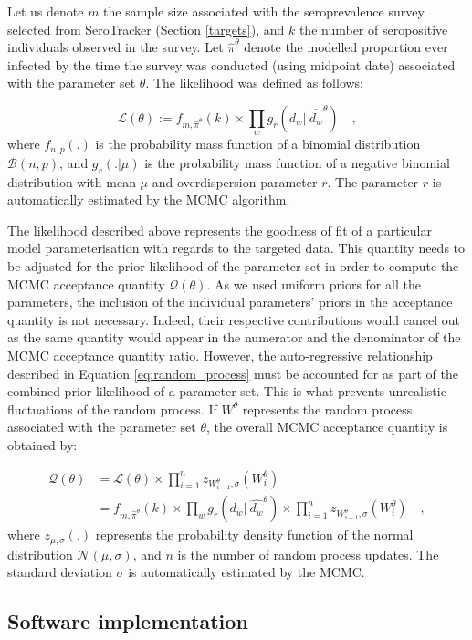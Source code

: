 Let us denote $m$ the sample size associated with the seroprevalence survey selected from SeroTracker (Section \ref{targets}), 
and $k$ the number of seropositive individuals observed in the survey.
Let $\hat{\pi}^\theta$ denote the modelled proportion ever infected by the time the survey was conducted (using midpoint date) 
associated with the parameter set $\theta$. 
The likelihood was defined as follows:

\begin{equation}
    \label{eq:likelihood}
    \mathcal{L}(\theta) := f_{m,\hat{\pi}^\theta}(k) \times \prod_w g_r(d_w | \:\hat{d_w}^\theta) \quad ,
\end{equation}
where $f_{n,p}(.)$ is the probability mass function of a binomial distribution $\mathcal{B}(n,p)$, and 
$g_r(. | \mu)$ is the probability mass function of a negative binomial distribution with mean $\mu$ and 
overdispersion parameter $r$. The parameter $r$ is automatically estimated by the MCMC algorithm.

The likelihood described above represents the goodness of fit of a particular model parameterisation with regards to the targeted data. 
This quantity needs to be adjusted for the prior likelihood of the parameter set in order to compute the MCMC acceptance quantity $\mathcal{Q}(\theta)$.
As we used uniform priors for all the parameters, the inclusion of the individual parameters' priors in the acceptance quantity is not necessary. 
Indeed, their respective contributions would cancel out as the same quantity would appear in the numerator and the denominator of the 
MCMC acceptance quantity ratio. However, the auto-regressive relationship described in Equation \ref{eq:random_process}
must be accounted for as part of the combined prior likelihood of a parameter set. This is what prevents unrealistic fluctuations of the random process.
If $W^\theta$ represents the random process associated with the parameter set $\theta$, the overall MCMC acceptance quantity is obtained by:

\begin{equation}
    \label{eq:acc_qtt}
    \begin{split}
    \mathcal{Q}(\theta) & = \mathcal{L}(\theta) \times \prod_{i=1}^{n} z_{W^\theta_{i-1},\sigma}(W^\theta_i) \\
                        & = f_{m,\hat{\pi}^\theta}(k) \times \prod_w g_r(d_w | \:\hat{d_w}^\theta) \times \prod_{i=1}^{n} z_{W^\theta_{i-1},\sigma}(W^\theta_i) \quad ,
    \end{split}
\end{equation}
where $z_{\mu,\sigma}(.)$ represents the probability density function of the normal distribution $\mathcal{N}(\mu, \sigma)$, and $n$ is the number 
of random process updates. The standard deviation $\sigma$ is automatically estimated by the MCMC.

\subsection{Software implementation}

